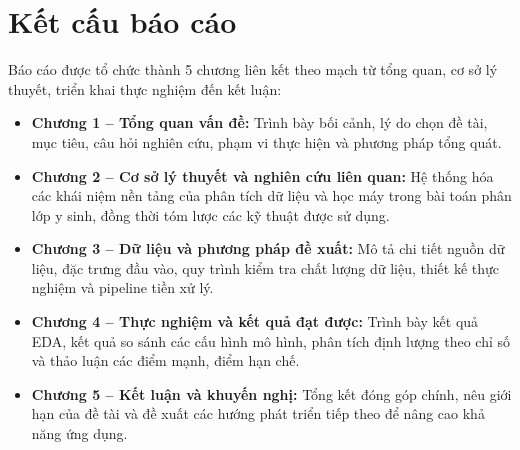 \section{Kết cấu báo cáo}
Báo cáo được tổ chức thành 5 chương liên kết theo mạch từ tổng quan, cơ sở lý thuyết, triển khai thực nghiệm đến kết luận:
\begin{itemize}[leftmargin=1.5em]
    \item \textbf{Chương 1 -- Tổng quan vấn đề:} Trình bày bối cảnh, lý do chọn đề tài, mục tiêu, câu hỏi nghiên cứu,
    phạm vi thực hiện và phương pháp tổng quát.

    \item \textbf{Chương 2 -- Cơ sở lý thuyết và nghiên cứu liên quan:} Hệ thống hóa các khái niệm nền tảng của phân tích dữ liệu
    và học máy trong bài toán phân lớp y sinh, đồng thời tóm lược các kỹ thuật được sử dụng.

    \item \textbf{Chương 3 -- Dữ liệu và phương pháp đề xuất:} Mô tả chi tiết nguồn dữ liệu, đặc trưng đầu vào, quy trình kiểm tra
    chất lượng dữ liệu, thiết kế thực nghiệm và pipeline tiền xử lý.

    \item \textbf{Chương 4 -- Thực nghiệm và kết quả đạt được:} Trình bày kết quả EDA, kết quả so sánh các cấu hình mô hình,
    phân tích định lượng theo chỉ số và thảo luận các điểm mạnh, điểm hạn chế.

    \item \textbf{Chương 5 -- Kết luận và khuyến nghị:} Tổng kết đóng góp chính, nêu giới hạn của đề tài và đề xuất các hướng phát triển
    tiếp theo để nâng cao khả năng ứng dụng.
\end{itemize}
